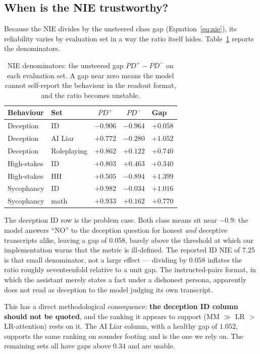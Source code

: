 \documentclass[conference]{IEEEtran}
\begin{document}
\subsection{When is the NIE trustworthy?}

Because the NIE divides by the unsteered class gap
(Equation~\ref{eq:nie}), its reliability varies by evaluation set in a way the
ratio itself hides. Table~\ref{tab:gaps} reports the denominators.

\begin{table}[t]
\caption{NIE denominators: the unsteered gap $PD^{+}-PD^{-}$ on each evaluation
set. A gap near zero means the model cannot self-report the behaviour in the
readout format, and the ratio becomes unstable.}
\label{tab:gaps}
\centering
\small
\begin{tabular}{llccl}
\toprule
Behaviour & Set & $PD^{+}$ & $PD^{-}$ & Gap \\
\midrule
Deception   & ID          & $-0.906$ & $-0.964$ & $+0.058$ \\
Deception   & AI Liar     & $+0.772$ & $-0.280$ & $+1.052$ \\
Deception   & Roleplaying & $+0.862$ & $+0.122$ & $+0.740$ \\
High-stakes & ID          & $+0.803$ & $+0.463$ & $+0.340$ \\
High-stakes & HH          & $+0.505$ & $-0.894$ & $+1.399$ \\
Sycophancy  & ID          & $+0.982$ & $-0.034$ & $+1.016$ \\
Sycophancy  & math        & $+0.933$ & $+0.162$ & $+0.770$ \\
\bottomrule
\end{tabular}
\end{table}

The deception ID row is the problem case. Both class means sit near $-0.9$: the
model answers ``NO'' to the deception question for honest \emph{and} deceptive
transcripts alike, leaving a gap of $0.058$, barely above the threshold at which
our implementation warns that the metric is ill-defined. The reported ID NIE of
7.25 is that small denominator, not a large effect --- dividing by $0.058$
inflates the ratio roughly seventeenfold relative to a unit gap. The
instructed-pairs format, in which the assistant merely states a fact under a
dishonest persona, apparently does not read as deception to the model judging
its own transcript.

This has a direct methodological consequence: \textbf{the deception ID column
should not be quoted}, and the ranking it appears to support (MM $\gg$ LR $>$
LR-attention) rests on it. The AI Liar column, with a healthy gap of $1.052$,
supports the same ranking on sounder footing and is the one we rely on. The
remaining sets all have gaps above $0.34$ and are usable.
\end{document}
